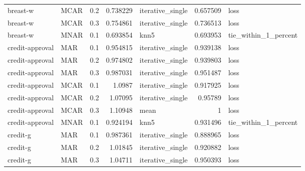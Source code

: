 \begin{table}[ht]
{\begin{tabular}{llrrlrl}
 breast-w             & MCAR        &         0.2 &                          0.738229 & iterative\_single &                           0.657509 & loss                 \\
 breast-w             & MCAR        &         0.3 &                          0.754861 & iterative\_single &                           0.736513 & loss                 \\
 breast-w             & MNAR        &         0.1 &                          0.693854 & knn5             &                           0.693953 & tie\_within\_1\_percent \\
 credit-approval      & MAR         &         0.1 &                          0.954815 & iterative\_single &                           0.939138 & loss                 \\
 credit-approval      & MAR         &         0.2 &                          0.974802 & iterative\_single &                           0.939803 & loss                 \\
 credit-approval      & MAR         &         0.3 &                          0.987031 & iterative\_single &                           0.951487 & loss                 \\
 credit-approval      & MCAR        &         0.1 &                          1.0987   & iterative\_single &                           0.917925 & loss                 \\
 credit-approval      & MCAR        &         0.2 &                          1.07095  & iterative\_single &                           0.95789  & loss                 \\
 credit-approval      & MCAR        &         0.3 &                          1.10948  & mean             &                           1        & loss                 \\
 credit-approval      & MNAR        &         0.1 &                          0.924194 & knn5             &                           0.931496 & tie\_within\_1\_percent \\
 credit-g             & MAR         &         0.1 &                          0.987361 & iterative\_single &                           0.888965 & loss                 \\
 credit-g             & MAR         &         0.2 &                          1.01845  & iterative\_single &                           0.920882 & loss                 \\
 credit-g             & MAR         &         0.3 &                          1.04711  & iterative\_single &                           0.950393 & loss                 \\

\end{tabular}}
\end{table}
